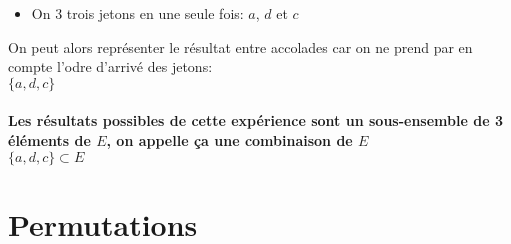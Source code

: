 \begin{itemize}
  \item On $3$ trois jetons en une seule fois: $a$, $d$ et $c$
\end{itemize}

On peut alors représenter le résultat entre accolades car on ne prend par en compte l'odre d'arrivé des jetons: \\ $\{ a, d, c \}$ \\ \\
\textbf{Les résultats possibles de cette expérience sont un sous-ensemble de 3 éléments de $E$, on appelle ça une combinaison de $E$} \\
$\{a, d, c\} \subset E$

\pagebreak

\section{Permutations}
